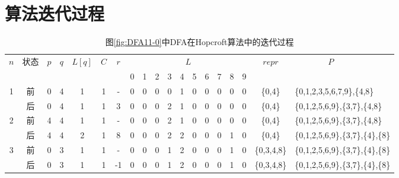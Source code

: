 \chapter{算法迭代过程}
\begin{table}[!htbp]
    \caption{图\ref{fig:DFA11-0}中DFA在Hopcroft算法中的迭代过程}
    \label{tab:hopcroft}
    \centering
    \footnotesize%
    \setlength{\tabcolsep}{4pt}%
    \renewcommand{\arraystretch}{1.2}%
    \begin{tabular}{ccccccc|cccccccccc|cl} 
        \toprule%
        \multirow{2}{*}{$n$} & \multirow{2}{*}{状态} & \multirow{2}{*}{$p$} & \multirow{2}{*}{$q$} & \multirow{2}{*}{$L[q]$} & \multirow{2}{*}{$C$} & \multirow{2}{*}{$r$} & \multicolumn{10}{c|}{$L$} & \multirow{2}{*}{$repr$} & \multirow{2}{*}{$\mbox{　　　　}P$}  \\
        \cline{8-17}             &                   &                     &                    &                       &                   &    & 0 & 1 &2 &3 &4 &5 &6 &7 & 8 & 9 & & \\
        \midrule%
        \multirow{2}{*}{1} & 前 & 0 & 4 & 1 & 1 & -  & 0 & 0 & 0 & 0 & 1 & 0 & 0 & 0 & 0 & 0 & \{0,4\} & \{0,1,2,3,5,6,7,9\},\{4,8\} \\
                           & 后 & 0 & 4 & 1 & 1 & 3  & 0 & 0 & 0 & 2 & 1 & 0 & 0 & 0 & 0 & 0 & \{0,4\} & \{0,1,2,5,6,9\},\{3,7\},\{4,8\} \\
        \midrule
        \multirow{2}{*}{2} & 前 & 4 & 4 & 1 & 1 & -  & 0 & 0 & 0 & 2 & 1 & 0 & 0 & 0 & 0 & 0 & \{0,4\} & \{0,1,2,5,6,9\},\{3,7\},\{4,8\} \\
                           & 后 & 4 & 4 & 2 & 1 & 8  & 0 & 0 & 0 & 2 & 2 & 0 & 0 & 0 & 1 & 0 & \{0,4\} & \{0,1,2,5,6,9\},\{3,7\},\{4\},\{8\} \\
        \midrule
        \multirow{2}{*}{3} & 前 & 0 & 3 & 1 & 1 & -  & 0 & 0 & 0 & 1 & 2 & 0 & 0 & 0 & 1 & 0 & \{0,3,4,8\} & \{0,1,2,5,6,9\},\{3,7\},\{4\},\{8\} \\
                           & 后 & 0 & 3 & 1 & 1 & -1 & 0 & 0 & 0 & 1 & 2 & 0 & 0 & 0 & 1 & 0 & \{0,3,4,8\} & \{0,1,2,5,6,9\},\{3,7\},\{4\},\{8\} \\
        \midrule
        

\end{tabular}
\end{table}

